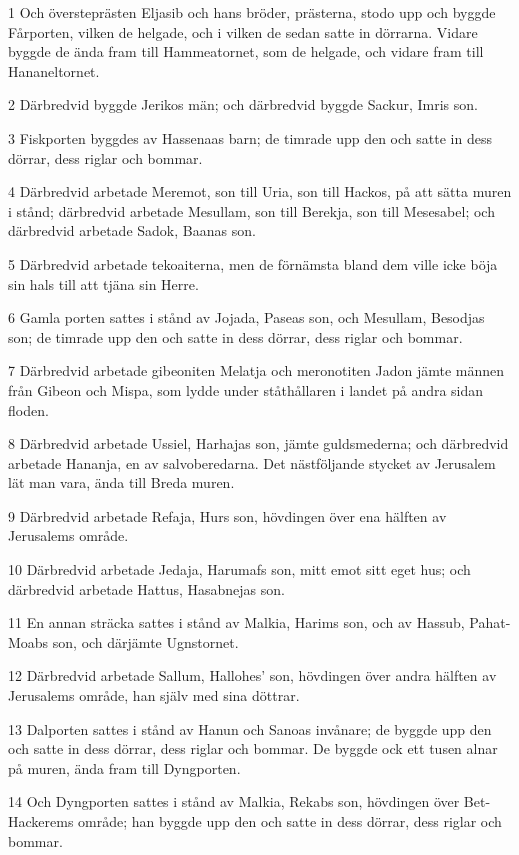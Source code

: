 \par 1 Och översteprästen Eljasib och hans bröder, prästerna, stodo upp och byggde Fårporten, vilken de helgade, och i vilken de sedan satte in dörrarna. Vidare byggde de ända fram till Hammeatornet, som de helgade, och vidare fram till Hananeltornet.
\par 2 Därbredvid byggde Jerikos män; och därbredvid byggde Sackur, Imris son.
\par 3 Fiskporten byggdes av Hassenaas barn; de timrade upp den och satte in dess dörrar, dess riglar och bommar.
\par 4 Därbredvid arbetade Meremot, son till Uria, son till Hackos, på att sätta muren i stånd; därbredvid arbetade Mesullam, son till Berekja, son till Mesesabel; och därbredvid arbetade Sadok, Baanas son.
\par 5 Därbredvid arbetade tekoaiterna, men de förnämsta bland dem ville icke böja sin hals till att tjäna sin Herre.
\par 6 Gamla porten sattes i stånd av Jojada, Paseas son, och Mesullam, Besodjas son; de timrade upp den och satte in dess dörrar, dess riglar och bommar.
\par 7 Därbredvid arbetade gibeoniten Melatja och meronotiten Jadon jämte männen från Gibeon och Mispa, som lydde under ståthållaren i landet på andra sidan floden.
\par 8 Därbredvid arbetade Ussiel, Harhajas son, jämte guldsmederna; och därbredvid arbetade Hananja, en av salvoberedarna. Det nästföljande stycket av Jerusalem lät man vara, ända till Breda muren.
\par 9 Därbredvid arbetade Refaja, Hurs son, hövdingen över ena hälften av Jerusalems område.
\par 10 Därbredvid arbetade Jedaja, Harumafs son, mitt emot sitt eget hus; och därbredvid arbetade Hattus, Hasabnejas son.
\par 11 En annan sträcka sattes i stånd av Malkia, Harims son, och av Hassub, Pahat-Moabs son, och därjämte Ugnstornet.
\par 12 Därbredvid arbetade Sallum, Hallohes' son, hövdingen över andra hälften av Jerusalems område, han själv med sina döttrar.
\par 13 Dalporten sattes i stånd av Hanun och Sanoas invånare; de byggde upp den och satte in dess dörrar, dess riglar och bommar. De byggde ock ett tusen alnar på muren, ända fram till Dyngporten.
\par 14 Och Dyngporten sattes i stånd av Malkia, Rekabs son, hövdingen över Bet-Hackerems område; han byggde upp den och satte in dess dörrar, dess riglar och bommar.
